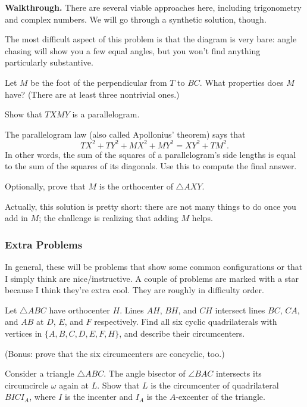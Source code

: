 \documentclass{scrartcl}
\providecommand{\ii}{\item}
\newenvironment{walkthrough}{\noindent\textbf{Walkthrough.}}{}
\begin{document}
\begin{walkthrough}
	There are several viable approaches here, including trigonometry
	and complex numbers. We will go through a synthetic solution, though.
	
	The most difficult aspect of this problem is that the diagram is very bare:
	angle chasing will show you a few equal angles, but you won't find
	anything particularly substantive.
	
	\begin{walk}
		\ii Let $M$ be the foot of the perpendicular from $T$ to $BC$.
		What properties does $M$ have?
		(There are at least three nontrivial ones.)
		\ii Show that $TXMY$ is a parallelogram.
		\ii The parallelogram law (also called Apollonius' theorem)
		says that
		\[TX^2 + TY^2 + MX^2 + MY^2 = XY^2 + TM^2.\]
		In other words, the sum of the squares of a parallelogram's side lengths
		is equal to the sum of the squares of its diagonals.
		Use this to compute the final answer.
		\ii Optionally, prove that $M$ is the orthocenter of $\triangle AXY$.
	\end{walk}
	
	Actually, this solution is pretty short: there are not many things to do
	once you add in $M$; the challenge is realizing that adding $M$ helps.
\end{walkthrough}

\subsubsection{Extra Problems}
In general, these will be problems that show some common configurations
or that I simply think are nice/instructive.
A couple of problems are marked with a star
because I think they're extra cool.
They are roughly in difficulty order.
\begin{problem}
	Let $\triangle ABC$ have orthocenter $H$. Lines $AH$, $BH$, and $CH$
	intersect lines $BC$, $CA$, and $AB$ at $D$, $E$, and $F$ respectively.
	Find all six cyclic quadrilaterals with vertices in
	$\{A, B, C, D, E, F, H\}$, and describe their circumcenters.
	
	(Bonus: prove that the six circumcenters are concyclic, too.)
\end{problem}

\begin{problem}
	Consider a triangle $\triangle ABC$. The angle bisector of
	$\angle BAC$ intersects its circumcircle $\omega$ again at $L$.
	Show that $L$ is the circumcenter of quadrilateral
	$BICI_A$, where $I$ is the incenter and $I_A$ is the $A$-excenter
	of the triangle.
\end{problem}
\end{document}
